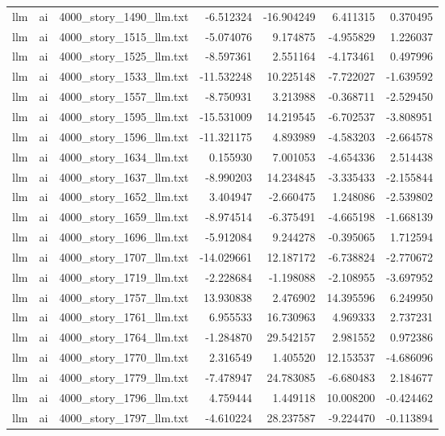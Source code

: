 \begin{longtable}{lllrrrr}
llm & ai & 4000\_story\_1490\_llm.txt & -6.512324 & -16.904249 & 6.411315 & 0.370495 \\
llm & ai & 4000\_story\_1515\_llm.txt & -5.074076 & 9.174875 & -4.955829 & 1.226037 \\
llm & ai & 4000\_story\_1525\_llm.txt & -8.597361 & 2.551164 & -4.173461 & 0.497996 \\
llm & ai & 4000\_story\_1533\_llm.txt & -11.532248 & 10.225148 & -7.722027 & -1.639592 \\
llm & ai & 4000\_story\_1557\_llm.txt & -8.750931 & 3.213988 & -0.368711 & -2.529450 \\
llm & ai & 4000\_story\_1595\_llm.txt & -15.531009 & 14.219545 & -6.702537 & -3.808951 \\
llm & ai & 4000\_story\_1596\_llm.txt & -11.321175 & 4.893989 & -4.583203 & -2.664578 \\
llm & ai & 4000\_story\_1634\_llm.txt & 0.155930 & 7.001053 & -4.654336 & 2.514438 \\
llm & ai & 4000\_story\_1637\_llm.txt & -8.990203 & 14.234845 & -3.335433 & -2.155844 \\
llm & ai & 4000\_story\_1652\_llm.txt & 3.404947 & -2.660475 & 1.248086 & -2.539802 \\
llm & ai & 4000\_story\_1659\_llm.txt & -8.974514 & -6.375491 & -4.665198 & -1.668139 \\
llm & ai & 4000\_story\_1696\_llm.txt & -5.912084 & 9.244278 & -0.395065 & 1.712594 \\
llm & ai & 4000\_story\_1707\_llm.txt & -14.029661 & 12.187172 & -6.738824 & -2.770672 \\
llm & ai & 4000\_story\_1719\_llm.txt & -2.228684 & -1.198088 & -2.108955 & -3.697952 \\
llm & ai & 4000\_story\_1757\_llm.txt & 13.930838 & 2.476902 & 14.395596 & 6.249950 \\
llm & ai & 4000\_story\_1761\_llm.txt & 6.955533 & 16.730963 & 4.969333 & 2.737231 \\
llm & ai & 4000\_story\_1764\_llm.txt & -1.284870 & 29.542157 & 2.981552 & 0.972386 \\
llm & ai & 4000\_story\_1770\_llm.txt & 2.316549 & 1.405520 & 12.153537 & -4.686096 \\
llm & ai & 4000\_story\_1779\_llm.txt & -7.478947 & 24.783085 & -6.680483 & 2.184677 \\
llm & ai & 4000\_story\_1796\_llm.txt & 4.759444 & 1.449118 & 10.008200 & -0.424462 \\
llm & ai & 4000\_story\_1797\_llm.txt & -4.610224 & 28.237587 & -9.224470 & -0.113894 \\

\end{longtable}
